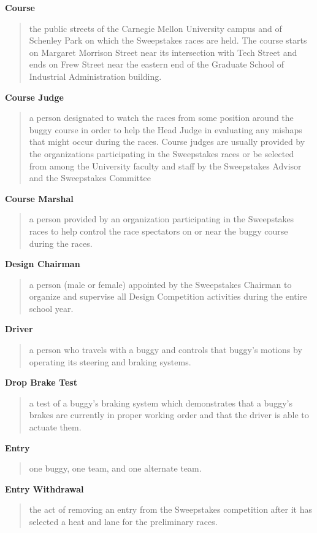 \documentclass[openany]{book}
\begin{document}
\textbf{Course}
\begin{quote}
	the public streets of the Carnegie Mellon University campus and of Schenley Park on which the Sweepstakes races are held. The course starts on Margaret Morrison Street near its intersection with Tech Street and ends on Frew Street near the eastern end of the Graduate School of Industrial Administration building.
\end{quote}

\textbf{Course Judge}
\begin{quote}
	a person designated to watch the races from some position around the buggy course in order to help the Head Judge in evaluating any mishaps that might occur during the races. Course judges are usually provided by the organizations participating in the Sweepstakes races or be selected from among the University faculty and staff by the Sweepstakes Advisor and the Sweepstakes Committee
\end{quote}

\textbf{Course Marshal}
\begin{quote}
	a person provided by an organization participating in the Sweepstakes races to help control the race spectators on or near the buggy course during the races.
\end{quote}

\textbf{Design Chairman}
\begin{quote}
	a person (male or female) appointed by the Sweepstakes Chairman to organize and supervise all Design Competition activities during the entire school year.
\end{quote}

\textbf{Driver}
\begin{quote}
	a person who travels with a buggy and controls that buggy's motions by operating its steering and braking systems.
\end{quote}

\textbf{Drop Brake Test}
\begin{quote}
	a test of a buggy's braking system which demonstrates that a buggy's brakes are currently in proper working order and that the driver is able to actuate them.
\end{quote}

\textbf{Entry}
\begin{quote}
	one buggy, one team, and one alternate team.
\end{quote}

\textbf{Entry Withdrawal}
\begin{quote}
	the act of removing an entry from the Sweepstakes competition after it has selected a heat and lane for the preliminary races.
\end{quote}
\end{document}

